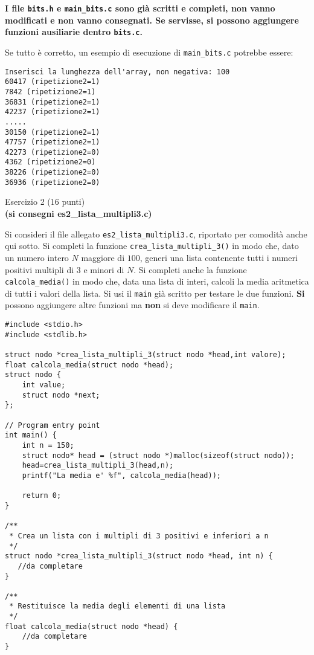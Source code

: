 \documentclass[12pt]{article}
\begin{document}
\begin{mdframed}[backgroundcolor=lightred] 
  \textbf{I file \texttt{bits.h} e \texttt{main\_bits.c} sono gi\`a scritti e completi, non vanno modificati e non vanno consegnati. Se servisse, si possono aggiungere funzioni ausiliarie dentro \texttt{bits.c}.}
\end{mdframed}

\vspace*{3ex}
Se tutto \`e corretto,
un esempio di esecuzione di \texttt{main\_bits.c} potrebbe essere:

\begin{mdframed}[backgroundcolor=verylightgray] 
\begin{verbatim}
Inserisci la lunghezza dell'array, non negativa: 100
60417 (ripetizione2=1)
7842 (ripetizione2=1)
36831 (ripetizione2=1)
42237 (ripetizione2=1)
.....
30150 (ripetizione2=1)
47757 (ripetizione2=1)
42273 (ripetizione2=0)
4362 (ripetizione2=0)
38226 (ripetizione2=0)
36936 (ripetizione2=0)
\end{verbatim}
\end{mdframed}

\begin{center}{\Large Esercizio 2} ($16$ punti)\\
  \textbf{(si consegni {es2\_lista\_multipli3.c})}
\end{center}

Si consideri il file allegato \texttt{es2\_lista\_multipli3.c}, riportato
per comodit\`a anche qui sotto.
Si completi la funzione \texttt{crea\_lista\_multipli\_3()} in modo che,
dato un numero intero $N$ maggiore di $100$, generi una lista contenente
tutti i numeri positivi multipli di $3$ e minori di $N$. Si completi anche
la funzione \texttt{calcola\_media()} in modo che, data una lista di interi,
calcoli la media aritmetica di tutti i valori della lista.
Si usi il \texttt{main} gi\`a scritto per testare le due funzioni.
\textbf{Si} possono aggiungere altre funzioni ma
\textbf{non} si deve modificare il \texttt{main}.

\begin{lstlisting}[language=myC]
#include <stdio.h>
#include <stdlib.h>

struct nodo *crea_lista_multipli_3(struct nodo *head,int valore);
float calcola_media(struct nodo *head);
struct nodo {
    int value;
    struct nodo *next;
};

// Program entry point
int main() {
    int n = 150;
    struct nodo* head = (struct nodo *)malloc(sizeof(struct nodo));
    head=crea_lista_multipli_3(head,n);
    printf("La media e' %f", calcola_media(head));
   
    return 0;
}

/**
 * Crea un lista con i multipli di 3 positivi e inferiori a n
 */
struct nodo *crea_lista_multipli_3(struct nodo *head, int n) {
   //da completare
}

/**
 * Restituisce la media degli elementi di una lista
 */
float calcola_media(struct nodo *head) {
    //da completare
}
\end{lstlisting}
	
	
	
	
	
\end{document}
